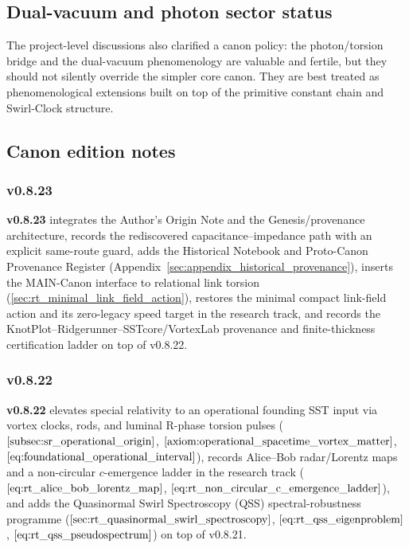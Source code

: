 \documentclass[11pt]{article}
\theoremstyle{definition}
\theoremstyle{plain}
\theoremstyle{remark}
\begin{document}
        \subsection{Dual-vacuum and photon sector status}
            The project-level discussions also clarified a canon policy: the photon/torsion bridge and the dual-vacuum phenomenology are valuable and fertile, but they should not silently override the simpler core canon. They are best treated as phenomenological extensions built on top of the primitive constant chain and Swirl-Clock structure.

        \subsection{Canon edition notes}

        \subsubsection{v0.8.23}
            \textbf{v0.8.23} integrates the Author's Origin Note and the Genesis/provenance architecture, records the rediscovered capacitance--impedance path with an explicit same-route guard, adds the Historical Notebook and Proto-Canon Provenance Register (Appendix~\ref{sec:appendix_historical_provenance}), inserts the MAIN-Canon interface to relational link torsion (\ref{sec:rt_minimal_link_field_action}), restores the minimal compact link-field action and its zero-legacy speed target in the research track, and records the KnotPlot--Ridgerunner--SSTcore/VortexLab provenance and finite-thickness certification ladder on top of v0.8.22.

        \subsubsection{v0.8.22}
            \textbf{v0.8.22} elevates special relativity to an operational founding SST input via vortex clocks, rods, and luminal R-phase torsion pulses (\(\ref{subsec:sr_operational_origin}\), \(\ref{axiom:operational_spacetime_vortex_matter}\), \(\ref{eq:foundational_operational_interval}\)), records Alice--Bob radar/Lorentz maps and a non-circular \(c\)-emergence ladder in the research track (\(\ref{eq:rt_alice_bob_lorentz_map}\), \(\ref{eq:rt_non_circular_c_emergence_ladder}\)), and adds the Quasinormal Swirl Spectroscopy (QSS) spectral-robustness programme (\(\ref{sec:rt_quasinormal_swirl_spectroscopy}\), \(\ref{eq:rt_qss_eigenproblem}\), \(\ref{eq:rt_qss_pseudospectrum}\)) on top of v0.8.21.
\end{document}
